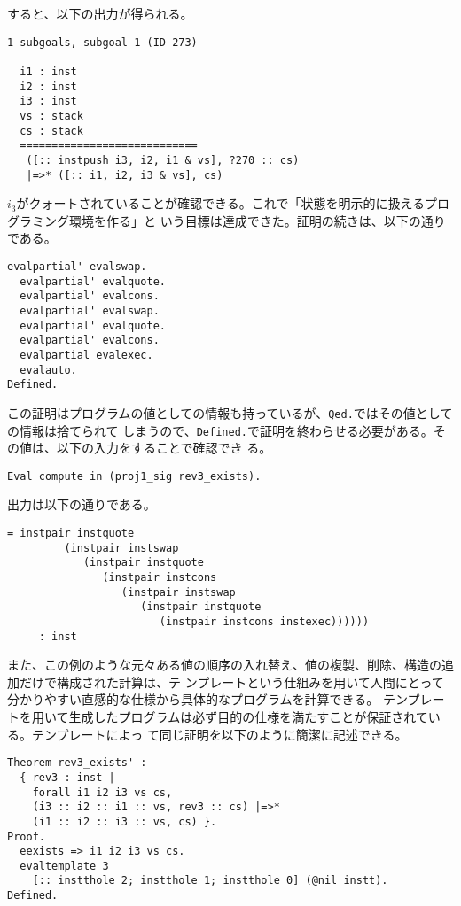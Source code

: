 \documentclass[a4paper, 10pt, twocolumn, titlepage]{ujarticle}
\renewcommand{\{}{\symbol{"7B}}
\renewcommand{\}}{\symbol{"7D}}
\begin{document}
すると、以下の出力が得られる。

\begin{lstlisting}[style=plain]
1 subgoals, subgoal 1 (ID 273)
  
  i1 : inst
  i2 : inst
  i3 : inst
  vs : stack
  cs : stack
  ============================
   ([:: instpush i3, i2, i1 & vs], ?270 :: cs)
   |=>* ([:: i1, i2, i3 & vs], cs)
\end{lstlisting}

$i_3$がクォートされていることが確認できる。これで「状態を明示的に扱えるプログラミング環境を作る」と
いう目標は達成できた。証明の続きは、以下の通りである。

\begin{lstlisting}[style=plain]
  evalpartial' evalswap.
  evalpartial' evalquote.
  evalpartial' evalcons.
  evalpartial' evalswap.
  evalpartial' evalquote.
  evalpartial' evalcons.
  evalpartial evalexec.
  evalauto.
Defined.
\end{lstlisting}

この証明はプログラムの値としての情報も持っているが、\texttt{Qed.}ではその値としての情報は捨てられて
しまうので、\texttt{Defined.}で証明を終わらせる必要がある。その値は、以下の入力をすることで確認でき
る。

\begin{lstlisting}[style=plain]
Eval compute in (proj1_sig rev3_exists).
\end{lstlisting}

出力は以下の通りである。

\begin{lstlisting}[style=plain]
     = instpair instquote
         (instpair instswap
            (instpair instquote
               (instpair instcons
                  (instpair instswap
                     (instpair instquote
                        (instpair instcons instexec))))))
     : inst
\end{lstlisting}

また、この例のような元々ある値の順序の入れ替え、値の複製、削除、構造の追加だけで構成された計算は、テ
ンプレートという仕組みを用いて人間にとって分かりやすい直感的な仕様から具体的なプログラムを計算できる。
テンプレートを用いて生成したプログラムは必ず目的の仕様を満たすことが保証されている。テンプレートによっ
て同じ証明を以下のように簡潔に記述できる。

\begin{lstlisting}[style=plain]
Theorem rev3_exists' :
  { rev3 : inst |
    forall i1 i2 i3 vs cs,
    (i3 :: i2 :: i1 :: vs, rev3 :: cs) |=>*
    (i1 :: i2 :: i3 :: vs, cs) }.
Proof.
  eexists => i1 i2 i3 vs cs.
  evaltemplate 3
    [:: instthole 2; instthole 1; instthole 0] (@nil instt).
Defined.
\end{lstlisting}
\end{document}
